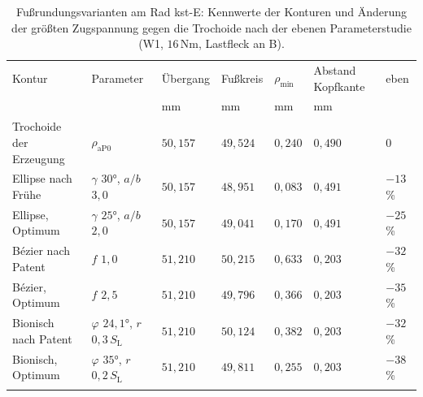 \begin{table}[htbp]
	\caption{Fußrundungsvarianten am Rad kst-E: Kennwerte der Konturen und Änderung der größten Zugspannung gegen die Trochoide nach der ebenen Parameterstudie (W1, $16$\,Nm, Lastfleck an B).}
	\label{tab:fussrundung_konturen}
	\centering
	\footnotesize
	\setlength{\tabcolsep}{4pt}
	\begin{tabular}{L{3.0cm}L{2.9cm}lllll}
		Kontur                  & Parameter                                        & Übergang   & Fußkreis   & $\rho_{\mathrm{min}}$ & Abstand Kopfkante & eben      \\
		                        &                                                  & mm         & mm         & mm                    & mm                &           \\
		\hline
		Trochoide der Erzeugung & $\rho_{\mathrm{aP0}}$                            & $50{,}157$ & $49{,}524$ & $0{,}240$             & $0{,}490$         & $0$       \\
		\hline
		Ellipse nach Frühe      & $\gamma$ $30$°, $a/b$ $3{,}0$                    & $50{,}157$ & $48{,}951$ & $0{,}083$             & $0{,}491$         & $-13$\,\% \\
		\hline
		Ellipse, Optimum        & $\gamma$ $25$°, $a/b$ $2{,}0$                    & $50{,}157$ & $49{,}041$ & $0{,}170$             & $0{,}491$         & $-25$\,\% \\
		\hline
		Bézier nach Patent      & $f$ $1{,}0$                                      & $51{,}210$ & $50{,}215$ & $0{,}633$             & $0{,}203$         & $-32$\,\% \\
		\hline
		Bézier, Optimum         & $f$ $2{,}5$                                      & $51{,}210$ & $49{,}796$ & $0{,}366$             & $0{,}203$         & $-35$\,\% \\
		\hline
		Bionisch nach Patent    & $\varphi$ $24{,}1$°, $r$ $0{,}3\,S_{\mathrm{L}}$ & $51{,}210$ & $50{,}124$ & $0{,}382$             & $0{,}203$         & $-32$\,\% \\
		\hline
		Bionisch, Optimum       & $\varphi$ $35$°, $r$ $0{,}2\,S_{\mathrm{L}}$     & $51{,}210$ & $49{,}811$ & $0{,}255$             & $0{,}203$         & $-38$\,\% \\
		\hline
	\end{tabular}
\end{table}


